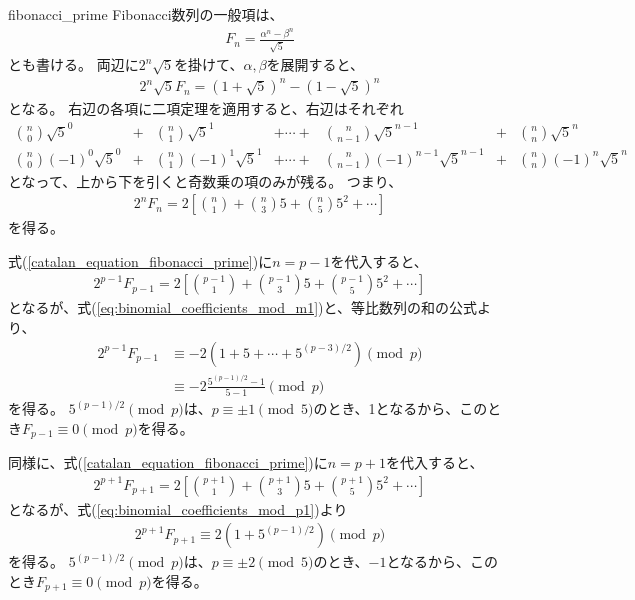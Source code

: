 \begin{thProof}{fibonacci_prime}
Fibonacci数列の一般項は、
\begin{align*}
F_n = \frac{\alpha^n - \beta^n}{\sqrt{5}}
\end{align*}
とも書ける。
両辺に$2^n\sqrt{5}$を掛けて、$\alpha,\beta$を展開すると、
\begin{align*}
2^n\sqrt{5}F_n = (1+\sqrt{5})^n - (1-\sqrt{5})^n
\end{align*}
となる。
右辺の各項に二項定理を適用すると、右辺はそれぞれ
\begin{align*}
{n \choose 0}\sqrt{5}^0       &+& {n \choose 1}\sqrt{5}^1       &+ \cdots +& {n \choose n-1}\sqrt{5}^{n-1}           &+& {n \choose n}\sqrt{5}^n\\
{n \choose 0}(-1)^0\sqrt{5}^0 &+& {n \choose 1}(-1)^1\sqrt{5}^1 &+ \cdots +& {n \choose n-1}(-1)^{n-1}\sqrt{5}^{n-1} &+& {n \choose n}(-1)^n\sqrt{5}^n
\end{align*}
となって、上から下を引くと奇数乗の項のみが残る。
つまり、
\begin{align}
\label{catalan_equation_fibonacci_prime}
2^n F_n = 2 \left[ {n \choose 1} + {n \choose 3}5 + {n \choose 5}5^2 + \cdots \right]
\end{align}
を得る。

式(\ref{catalan_equation_fibonacci_prime})に$n=p-1$を代入すると、
\begin{align*}
2^{p-1}F_{p-1} = 2 \left[ {p-1 \choose 1} + {p-1 \choose 3}5 + {p-1 \choose 5}5^2 + \cdots \right]
\end{align*}
となるが、式(\ref{eq:binomial_coefficients_mod_m1})と、等比数列の和の公式より、
\begin{align*}
2^{p-1}F_{p-1} &\equiv -2 (1 + 5 + \cdots + 5^{(p-3)/2}) \pmod{p}\\
&\equiv -2 \frac{5^{(p-1)/2} - 1}{5-1}\pmod{p}
\end{align*}
を得る。
$5^{(p-1)/2}\pmod{p}$は、$p\equiv\pm1\pmod{5}$のとき、1となるから、このとき$F_{p-1}\equiv 0\pmod{p}$を得る。

同様に、式(\ref{catalan_equation_fibonacci_prime})に$n=p+1$を代入すると、
\begin{align*}
2^{p+1}F_{p+1} = 2 \left[ {p+1 \choose 1} + {p+1 \choose 3}5 + {p+1 \choose 5}5^2 + \cdots \right]
\end{align*}
となるが、式(\ref{eq:binomial_coefficients_mod_p1})より
\begin{align*}
2^{p+1}F_{p+1} \equiv 2 (1 + 5^{(p-1)/2}) \pmod{p}
\end{align*}
を得る。
$5^{(p-1)/2}\pmod{p}$は、$p\equiv\pm2\pmod{5}$のとき、$-1$となるから、このとき$F_{p+1}\equiv 0\pmod{p}$を得る。
\end{thProof}
